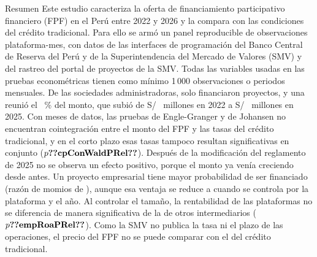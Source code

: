 \begin{resumen}{Resumen}
Este estudio caracteriza la oferta de financiamiento participativo financiero (FPF) en el Perú entre 2022 y 2026 y la compara con las condiciones del crédito tradicional. Para ello se armó un panel reproducible de  observaciones plataforma-mes, con datos de las interfaces de programación del Banco Central de Reserva del Perú y de la Superintendencia del Mercado de Valores (SMV) y del rastreo del portal de proyectos de la SMV. Todas las variables usadas en las pruebas econométricas tienen como mínimo 1\,000 observaciones o  periodos mensuales. De las  sociedades administradoras, solo  financiaron proyectos, y una reunió el ~\% del monto, que subió de S/~ millones en 2022 a S/~ millones en 2025. Con  meses de datos, las pruebas de Engle-Granger y de Johansen no encuentran cointegración entre el monto del FPF y las tasas del crédito tradicional, y en el corto plazo esas tasas tampoco resultan significativas en conjunto ($p\cifra{cpConWaldPRel}$). Después de la modificación del reglamento de 2025 no se observa un efecto positivo, porque el monto ya venía creciendo desde antes. Un proyecto empresarial tiene mayor probabilidad de ser financiado (razón de momios de ), aunque esa ventaja se reduce a  cuando se controla por la plataforma y el año. Al controlar el tamaño, la rentabilidad de las plataformas no se diferencia de manera significativa de la de otros intermediarios ($p\cifra{empRoaPRel}$). Como la SMV no publica la tasa ni el plazo de las operaciones, el precio del FPF no se puede comparar con el del crédito tradicional.
\end{resumen}%
%
